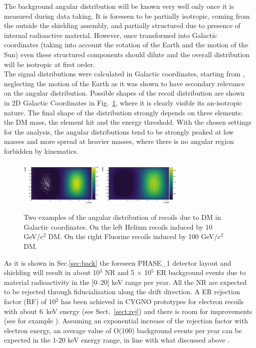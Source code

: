 \documentclass[physics,article,submit,moreauthors,pdftex]{Definitions/mdpi}
\begin{document}
 
 The background angular distribution will be known very well only once it is measured during data taking. It is foreseen to be partially isotropic, coming from the outside the shielding assembly, and partially structured due to presence of internal radioactive material. However, once transformed into Galactic coordinates (taking into account the rotation of the Earth and the motion of the Sun) even these structured components should dilute and the overall distribution will be isotropic at first order.\\
The signal distributions were calculated in Galactic coordinates, starting from \cite{bib:LEWIN199687,bib:Gondolo_2002,bib:baxter2021recommended}, neglecting the motion of the Earth as it was shown to have secondary relevance on the angular distribution. Possible shapes of the recoil distribution are shown in 2D Galactic Coordinates in Fig.~\ref{fig:spectra2D}, where it is clearly visible its an-isotropic nature. The final shape of the distribution strongly depends on three elements: the DM mass, the element hit and the energy threshold. With the chosen settings for the analysis, the angular distributions tend to be strongly peaked at low masses and more spread at heavier masses, where there is no angular region forbidden by kinematics.
\begin{figure}[!th]
  \centering
\includegraphics[width=0.36\textwidth]{Heliumrecoil_10GeV.png}
\includegraphics[width=0.36\textwidth]{WIMP_F_100GeV.png}
\caption{Two examples of the angular distribution of recoils due to DM in Galactic coordinates. On the left Helium recoils induced by 10 GeV/c$^2$ DM. On the right Fluorine recoils induced by 100 GeV/c$^2$ DM.}
 \label{fig:spectra2D}
\end{figure}


As it is shown in Sec.\ref{sec:back} the foreseen PHASE\_1 detector layout and shielding will result in about 10$^3$ NR and 5 $\times$ 10$^5$ ER background events due to material radioactivity in the [0--20] keV range per year. All the NR are expected to be rejected through fiducialisation along the drift direction.  A ER rejection factor (RF) of 10$^2$ has been achieved in CYGNO prototypes for electron recoils with about 6~keV energy (see Sect.~\ref{sect:rej}) and there is room for improvements (see for example \cite{bib:recoil}). Assuming an exponential increase of the rejection factor with electron energy, an average value of O(100) background events per year can be expected in the 1-20 keV energy range, in line with what discussed above \cite{Riffard:2016mgw,Phan:2015pda}. 
\end{document}
